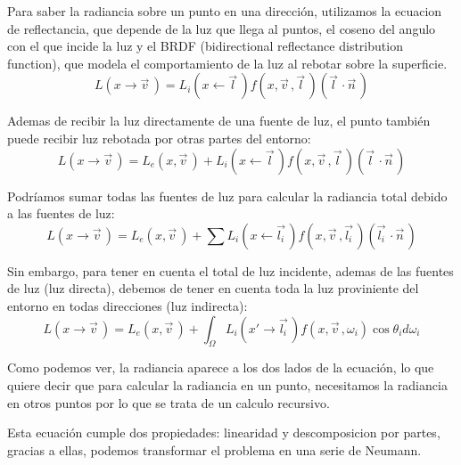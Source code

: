     Para saber la radiancia sobre un punto en una direcci\'on, utilizamos la ecuacion de reflectancia, que depende
    de la luz que llega al puntos, el coseno del angulo con el que incide la luz y el BRDF (bidirectional reflectance
    distribution function), que modela el comportamiento de la luz al rebotar sobre la superficie.
    \begin{equation}
        L(x\xrightarrow{}{\vec{v}{\,}})
        = L_i(x\xleftarrow{}{\vec{l}{\,}})
        f(x, \vec{v}{\,}, \vec{l}{\,})
        (\vec{l}{\,}\cdotp{\vec{n}{\,}})
    \end{equation}
    \singlespacing

    Ademas de recibir la luz directamente de una fuente de luz, el punto tambi\'en puede recibir luz rebotada por otras
    partes del entorno:
    \begin{equation}
        L(x\xrightarrow{}{\vec{v}{\,}})
        = L_e(x, \vec{v}{\,}) +
        L_i(x\xleftarrow{}{\vec{l}{\,}})
        f(x, \vec{v}{\,}, \vec{l}{\,})
        (\vec{l}{\,}\cdotp{\vec{n}{\,}})
    \end{equation}
    \singlespacing

    Podr\'iamos sumar todas las fuentes de luz para calcular la radiancia total debido a las fuentes de luz:
    \begin{equation}
        L(x\xrightarrow{}{\vec{v}{\,}})
        = L_e(x, \vec{v}{\,}) +
        \sum{}L_i(x\xleftarrow{}{\vec{l_i}{\,}})
        f(x, \vec{v}{\,}, \vec{l_i}{\,})
        (\vec{l_i}{\,}\cdotp{\vec{n}{\,}})
    \end{equation}
    \singlespacing

    Sin embargo, para tener en cuenta el total de luz incidente, ademas de las fuentes de luz (luz directa), debemos
    de tener en cuenta toda la luz proviniente del entorno en todas direcciones (luz indirecta):
    \begin{equation}
        L(x\xrightarrow{}{\vec{v}{\,}})
        = L_e(x, \vec{v}{\,}) +
        \int_{\Omega}L_i(x'\xrightarrow{}{\vec{l_i}{\,}})
        f(x, \vec{v}{\,}, \omega_i)
        \cos\theta_id\omega_i
    \end{equation}
    \singlespacing

    Como podemos ver, la radiancia aparece a los dos lados de la ecuaci\'on, lo que quiere decir que para calcular la radiancia
    en un punto, necesitamos la radiancia en otros puntos por lo que se trata de un calculo recursivo.

    Esta ecuaci\'on cumple dos propiedades: linearidad y descomposicion por partes, gracias a ellas, podemos transformar el problema
    en una serie de Neumann.

